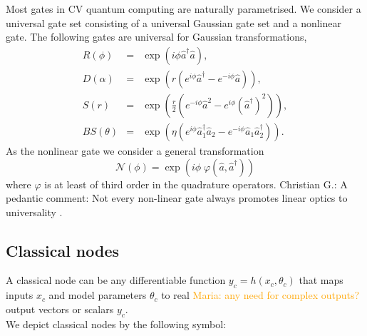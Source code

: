 \documentclass[aps,pra,10pt,twocolumn,groupedaddress,nofootinbib]{revtex4-1}
\theoremstyle{plain}
\renewcommand{\a}{\hat{a}}
\newcommand{\adag}{\hat{a}^{\dagger}}
\newcommand{\maria}[1]{\textcolor{orange}{Maria: #1}}
\newcommand{\cg}[1]{\textcolor{cyan!80!black}{Christian G.: #1}}
\begin{document}
Most gates in CV quantum computing are naturally parametrised. We consider a universal gate set consisting of a universal Gaussian gate set and a nonlinear gate. The following gates are universal for Gaussian transformations,
\begin{eqnarray}
  	R(\phi) & =& \exp\left(i \phi \adag \a \right), \\
  	D(\alpha) & =& \exp(r (e^{i\phi} \adag -e^{-i\phi} \a)), \\
  	S(r) & =& \exp \left(\frac{r}{2} \left(e^{-i\phi} \a^2 -e^{i\phi}  (\adag)^2 \right) \right), \\
  	BS(\theta) & =& \exp\left(\eta (e^{i \phi} \adag_1 \a_2 -e^{-i \phi}\a_1 \adag_2) \right).
  \label{Eq:gaussiangates}
\end{eqnarray}
As the nonlinear gate we consider a general transformation
\begin{equation}
	\mathcal{N}(\phi) = \exp(i \phi \; \varphi(\a, \adag))
	\label{Eq:nonlineargate}
\end{equation}
where $\varphi$ is at least of third order in the quadrature operators.
\cg{A pedantic comment: Not every non-linear gate always promotes linear optics to universality \cite{Oszmaniec2017}.}

\subsection{Classical nodes}

A classical node can be any differentiable function $y_c = h(x_c, \theta_c)$ that maps inputs $x_c$ and model parameters $\theta_c$ to real \maria{any need for complex outputs?} output vectors or scalars $y_c$.\\

We depict classical nodes by the following symbol:\\
\begin{figure}[h]
\centering
{}
\end{figure}
\end{document}
